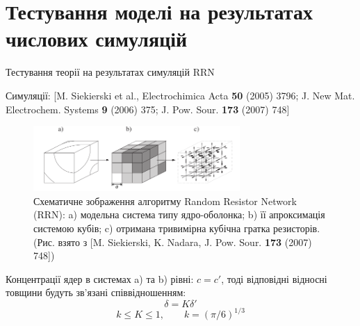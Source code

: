 \documentclass[10pt]{beamer}
\begin{document}
\section{Тестування моделі на результатах числових симуляцій}%

\begin{frame}{Тестування теорії на результатах симуляцій RRN}

{\footnotesize
Симуляції: [M. Siekierski et al., Electrochimica Acta {\bf 50} (2005) 3796; 
J. New Mat. Electrochem. Systems {\bf 9} (2006) 375;
J. Pow. Sour. {\bf 173} (2007) 748]
}

\begin{figure}[tb]
    \centering
    \includegraphics[width=0.7\textwidth]{images/RRN.png}
    \caption{Схематичне зображення алгоритму Random Resistor Network (RRN): a) модельна система типу ядро-оболонка; b) її апроксимація системою кубів; c) отримана тривимірна кубічна гратка резисторів.\\ {\footnotesize (Рис. взято з [M. Siekierski, K. Nadara, J. Pow. Sour. {\bf 173} (2007) 748])}}
\end{figure}
\vspace{-10pt}
Концентрації ядер в системах a) та b) рівні: $c=c'$, тоді відповідні відносні товщини будуть зв'язані співвідношенням:
$$
    \delta = K\delta'
$$
$$
    k \leq K \leq 1, \qquad k=(\pi/6)^{1/3}
$$

\end{frame}
\end{document}
